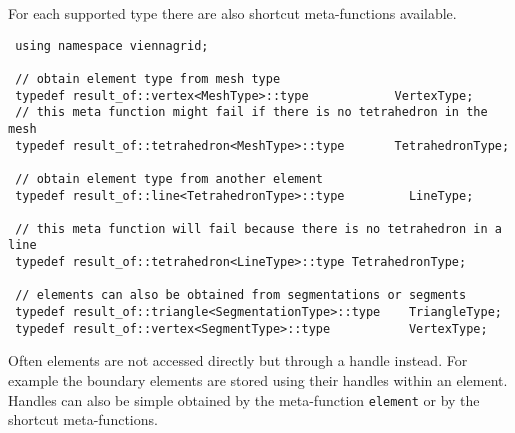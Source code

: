 For each supported type there are also shortcut meta-functions available.

\begin{lstlisting}
 using namespace viennagrid;
 
 // obtain element type from mesh type
 typedef result_of::vertex<MeshType>::type            VertexType;
 // this meta function might fail if there is no tetrahedron in the mesh
 typedef result_of::tetrahedron<MeshType>::type       TetrahedronType;
 
 // obtain element type from another element
 typedef result_of::line<TetrahedronType>::type         LineType;
 
 // this meta function will fail because there is no tetrahedron in a line
 typedef result_of::tetrahedron<LineType>::type TetrahedronType;
 
 // elements can also be obtained from segmentations or segments
 typedef result_of::triangle<SegmentationType>::type    TriangleType;
 typedef result_of::vertex<SegmentType>::type           VertexType;
\end{lstlisting}

\pagebreak

Often elements are not accessed directly but through a handle instead. For example the boundary elements are stored using their handles within an element. Handles can also be simple obtained by the meta-function \lstinline|element| or by the shortcut meta-functions.


